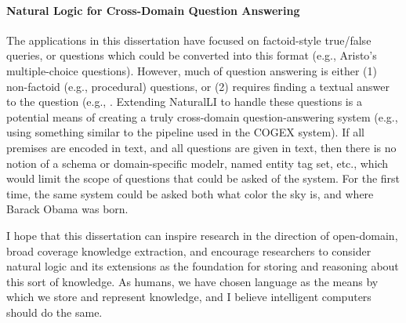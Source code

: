 \paragraph{Natural Logic for Cross-Domain Question Answering}
The applications in this dissertation have focused on factoid-style true/false queries,
  or questions which could be converted into this format (e.g., Aristo's multiple-choice questions).
However, much of question answering is either (1) non-factoid (e.g., procedural) questions, or
  (2) requires finding a textual answer to the question (e.g., .
Extending NaturalLI to handle these questions is a potential means of creating a truly cross-domain
  question-answering system (e.g., using something similar to the pipeline used in the COGEX system).
If all premises are encoded in text, and all questions are given in text, then there is no notion of
  a schema or domain-specific modelr, named entity tag set, etc., which would limit the scope of questions
  that could be asked of the system.
For the first time, the same system could be asked both what color the sky is, and where Barack Obama was
  born.

I hope that this dissertation can inspire research in the direction of open-domain, broad coverage
  knowledge extraction, and encourage researchers to consider natural logic and its extensions
  as the foundation for storing and reasoning about this sort of knowledge.
As humans, we have chosen language as the means by which we store and represent knowledge, and I
  believe intelligent computers should do the same.

